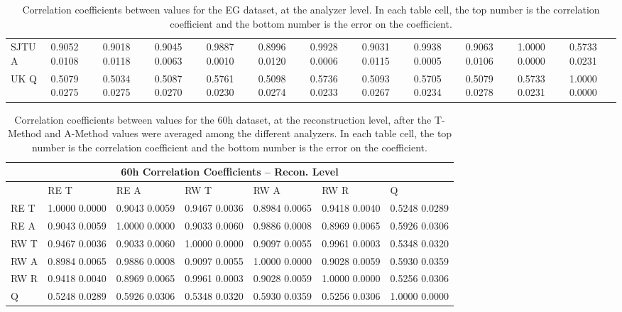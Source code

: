 \begin{landscape}
\begin{table}
\begin{tabularx}{1\linewidth}{@{\extracolsep{\fill}}lXXXXXXXXXXX}
	SJTU A & 0.9052 0.0108 & 0.9018 0.0118 & 0.9045 0.0063 & 0.9887 0.0010 & 0.8996 0.0120 & 0.9928 0.0006 & 0.9031 0.0115 & 0.9938 0.0005 & 0.9063 0.0106 & 1.0000 0.0000 & 0.5733 0.0231  \\
	UK Q   & 0.5079 0.0275 & 0.5034 0.0275 & 0.5087 0.0270 & 0.5761 0.0230 & 0.5098 0.0274 & 0.5736 0.0233 & 0.5093 0.0267 & 0.5705 0.0234 & 0.5079 0.0278 & 0.5733 0.0231 & 1.0000 0.0000  \\
  \bottomrule
\end{tabularx}
\caption[]{Correlation coefficients between \R values for the EG dataset, at the analyzer level. In each table cell, the top number is the correlation coefficient and the bottom number is the error on the coefficient.}
\label{tab:Corrs_EG_analyzer}
\end{table}
\end{landscape}







\begin{table}[h]
\setlength\tabcolsep{15pt}
\footnotesize
\centering
\renewcommand{\arraystretch}{1.4}
\begin{tabularx}{0.8\linewidth}{@{\extracolsep{\fill}}lXXXXXX}
  \toprule
  	\multicolumn{7}{c}{{\normalsize 60h Correlation Coefficients -- Recon. Level}} \\
  \midrule
  	       & RE T & RE A & RW T & RW A & RW R & \quad Q \\
  \midrule
	RE T   & 1.0000 0.0000 & 0.9043 0.0059 & 0.9467 0.0036 & 0.8984 0.0065 & 0.9418 0.0040 & 0.5248 0.0289  \\
	RE A   & 0.9043 0.0059 & 1.0000 0.0000 & 0.9033 0.0060 & 0.9886 0.0008 & 0.8969 0.0065 & 0.5926 0.0306  \\
	RW T   & 0.9467 0.0036 & 0.9033 0.0060 & 1.0000 0.0000 & 0.9097 0.0055 & 0.9961 0.0003 & 0.5348 0.0320  \\
	RW A   & 0.8984 0.0065 & 0.9886 0.0008 & 0.9097 0.0055 & 1.0000 0.0000 & 0.9028 0.0059 & 0.5930 0.0359  \\
	RW R   & 0.9418 0.0040 & 0.8969 0.0065 & 0.9961 0.0003 & 0.9028 0.0059 & 1.0000 0.0000 & 0.5256 0.0306  \\
	Q      & 0.5248 0.0289 & 0.5926 0.0306 & 0.5348 0.0320 & 0.5930 0.0359 & 0.5256 0.0306 & 1.0000 0.0000  \\
  \bottomrule
\end{tabularx}
\caption[]{Correlation coefficients between \R values for the 60h dataset, at the reconstruction level, after the \RW T-Method and A-Method \R values were averaged among the different analyzers. In each table cell, the top number is the correlation coefficient and the bottom number is the error on the coefficient.}
\label{tab:Corrs_60h_recon}
\end{table}



